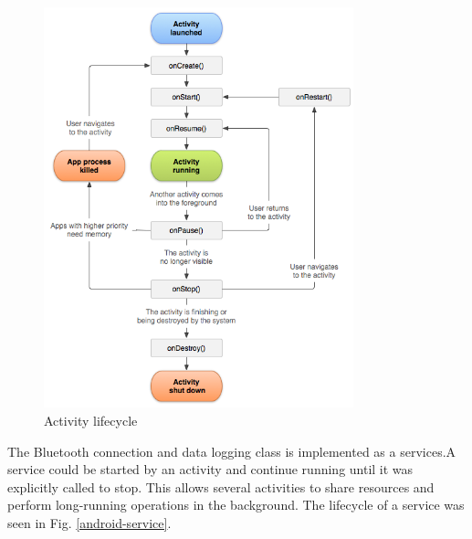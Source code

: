 \begin{figure}[H]
\centering
\includegraphics[width=0.8\textwidth]{Figures/activity_lifecycle.png}
\caption{Activity lifecycle}
\label{android-activity}
\end{figure}
The Bluetooth connection and data logging class is implemented as a services\cite{android-service}.A service could be started by an activity and continue running until it was explicitly called to stop. This allows several activities to share resources
and perform long-running operations in the background. The lifecycle
of a service was seen in Fig. \ref{android-service}.

